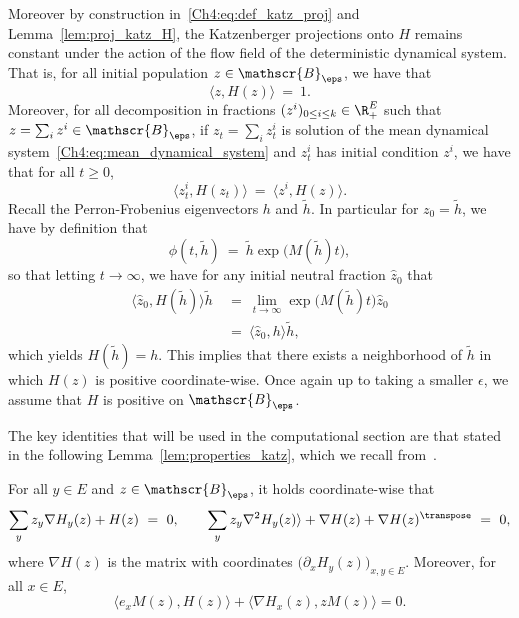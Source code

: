\begin{refsegment}
Moreover by construction in~\eqref{Ch4:eq:def_katz_proj} and Lemma~\ref{lem:proj_katz_H}, the Katzenberger projections onto $H$ remains constant under the action of the flow field of the deterministic dynamical system. That is, for all initial population $z\in \mathscr{B}_\eps$, we have that 
\begin{equation}\label{Ch4:eq:katz_proj_is_one}
\langle z, H(z)\rangle\ =\ 1.
\end{equation}
Moreover, for all decomposition in fractions $(z^i)_{0\leq i\leq k}\in \R_+^E$ such that $z=\sum_i z^i\in\mathscr{B}_\eps$, if $z_t=\sum_{i}z^i_t$ is solution of the mean dynamical system~\eqref{Ch4:eq:mean_dynamical_system} and $z_t^i$ has initial condition $z^i$, we have that for all $t\geq 0$,
\begin{equation}\label{Ch4:eq:katz_identity_flow}
\langle z^i_t, H(z_t)\rangle\ =\ \langle z^i, H(z)\rangle.
\end{equation}
Recall the Perron-Frobenius eigenvectors $h$ and $\tilde h$.
In particular for $z_0= \tilde h$, we have by definition that
\[
 \phi(t, \tilde h )\ =\ \tilde h \exp\big(M(\tilde h)t\big),
\]
so that letting $t\to\infty$, we have for any initial neutral fraction $\hat{z}_0$ that
\begin{align*}
\langle \hat z_0, H(\tilde h)\rangle\tilde h\ &=\ \lim_{t\to \infty} \exp\big(M(\tilde h)t\big)\hat z_0\\
& =\ \langle \hat z_0, h\rangle \tilde h ,
\end{align*}
which yields $H(\tilde h) = h$.
This implies that there exists a neighborhood of $\tilde h$ in which $H(z)$ is positive coordinate-wise. Once again up to taking a smaller $\epsilon$, we assume that $H$ is positive on $\mathscr{B}_{\eps}$.

The key identities that will be used in the computational section are that stated in the following Lemma~\ref{lem:properties_katz}, which we recall from~\cite{Julie_Zsofia}.
\begin{lem}{\cite[Lemma~12]{Julie_Zsofia}}\label{lem:properties_katz}
For all $y\in E$ and $z\in \mathscr{B}_\eps$, it holds coordinate-wise that
\begin{equation}\label{Ch4:eq:katz_identity}
\sum_y z_y \nabla H_y(z)  + H(z)\ =\ 0, \qquad
\sum_y z_y  \nabla^2 H_y(z)\rangle + \nabla H(z)+ \nabla H(z)^{\transpose}\ =\ 0,
\end{equation}
where $\nabla H(z)$ is the matrix with coordinates $\big(\partial_x H_y(z)\big)_{x,y\in E}$.
Moreover, for all $x\in E$,
\begin{equation}\label{Ch4:eq:regle_calcul_katz}
  \big\langle e_{x} M(z), H(z)\big\rangle +  \big\langle\nabla H_{x}(z), zM(z)\big\rangle = 0.
\end{equation}


\end{lem}
\end{refsegment}
